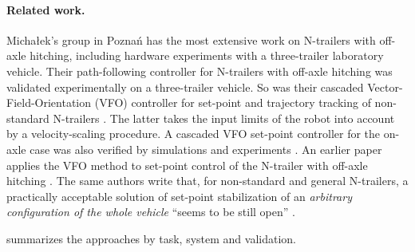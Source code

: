 \paragraph{Related work.}
Michałek's group in Poznań has the most extensive work on N-trailers with
off-axle hitching, including hardware experiments with a three-trailer
laboratory vehicle. Their path-following controller for N-trailers with
off-axle hitching \cite{michalek2014pf} was validated experimentally on a
three-trailer vehicle. So was their cascaded Vector-Field-Orientation (VFO)
controller for set-point and trajectory tracking of non-standard N-trailers
\cite{michalek2015jint}. The latter takes the input limits of the robot into
account by a velocity-scaling procedure. A cascaded VFO set-point controller
for the on-axle case was also verified by simulations and experiments
\cite{michalek2014tcst}. An earlier paper applies the VFO method to set-point
control of the N-trailer with off-axle hitching \cite{michalek2012}.
The same authors write that, for non-standard and general N-trailers, a
practically acceptable solution of set-point stabilization of an
\emph{arbitrary configuration of the whole vehicle} ``seems to be still open''
\cite{michalek2015jint}.

 summarizes the approaches by task, system and validation.


